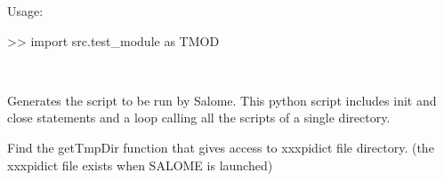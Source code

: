\documentclass[a4paper,10pt,english]{sphinxmanual}
\begin{document}
\begin{DUlineblock}{0em}
\item[] Usage:
\item[] \textgreater{}\textgreater{} import src.test\_module as TMOD
\end{DUlineblock}

\begin{fulllineitems}
\label{\detokenize{apidoc_src/src:src.test_module.Test}}~

\begin{fulllineitems}
\label{\detokenize{apidoc_src/src:src.test_module.Test.generate_launching_commands}}
\end{fulllineitems}


\begin{fulllineitems}
\label{\detokenize{apidoc_src/src:src.test_module.Test.generate_script}}
Generates the script to be run by Salome.
This python script includes init and close statements and a loop
calling all the scripts of a single directory.

\end{fulllineitems}


\begin{fulllineitems}
\label{\detokenize{apidoc_src/src:src.test_module.Test.get_test_timeout}}
\end{fulllineitems}


\begin{fulllineitems}
\label{\detokenize{apidoc_src/src:src.test_module.Test.get_tmp_dir}}
Find the getTmpDir function that gives access to xxxpidict file directory.
(the xxxpidict file exists when SALOME is launched)


\end{fulllineitems}
\end{fulllineitems}
\end{document}

